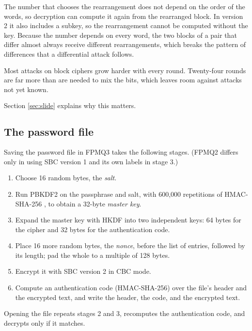 \begin{description}[style=nextline]
\item[The permutation can be undone, and in version 2 it is secret.]
The number that chooses the rearrangement does not depend on the order of the
words, so decryption can compute it again from the rearranged block. In version
2 it also includes a subkey, so the rearrangement cannot be computed without the
key. Because the number depends on every word, the two blocks of a pair that
differ almost always receive different rearrangements, which breaks the pattern
of differences that a differential attack follows.

\item[Many rounds give a margin.]
Most attacks on block ciphers grow harder with every round. Twenty-four rounds
are far more than are needed to mix the bits, which leaves room against attacks
not yet known.

\item[Every step has its own subkey (versions 1 and 2).]
Section \ref{sec:slide} explains why this matters.
\end{description}

\subsection{The password file}

Saving the password file in FPMQ3 takes the following stages. (FPMQ2 differs
only in using SBC version 1 and its own labels in stage 3.)
\begin{enumerate}[nosep]
\item Choose 16 random bytes, the \emph{salt}.
\item Run PBKDF2 \cite{rfc8018} on the passphrase and salt, with 600,000
      repetitions of HMAC-SHA-256 \cite{rfc2104,fips180}, to obtain a 32-byte
      \emph{master key}.
\item Expand the master key with HKDF \cite{rfc5869} into two independent keys:
      64 bytes for the cipher and 32 bytes for the authentication code.
\item Place 16 more random bytes, the \emph{nonce}, before the list of entries,
      followed by its length; pad the whole to a multiple of 128 bytes.
\item Encrypt it with SBC version 2 in CBC mode.
\item Compute an authentication code (HMAC-SHA-256) over the file's header and
      the encrypted text, and write the header, the code, and the encrypted
      text.
\end{enumerate}
Opening the file repeats stages 2 and 3, recomputes the authentication code,
and decrypts only if it matches.

